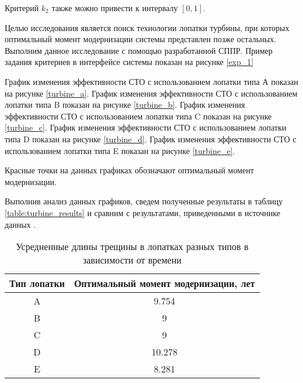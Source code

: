 Критерий $k_2$ также можно привести к интервалу $[0,1]$.

Целью исследования является поиск технологии лопатки турбины, при которых оптимальный момент модернизации системы представлен позже остальных.
Выполним данное исследование с помощью разработанной СППР.
Пример задания критериев в интерфейсе системы показан на рисунке \ref{exp_1}


График изменения эффективности СТО с использованием лопатки типа А показан на рисунке \ref{turbine_a}.
График изменения эффективности СТО с использованием лопатки типа B показан на рисунке \ref{turbine_b}.
График изменения эффективности СТО с использованием лопатки типа C показан на рисунке \ref{turbine_c}.
График изменения эффективности СТО с использованием лопатки типа D показан на рисунке \ref{turbine_d}.
График изменения эффективности СТО с использованием лопатки типа E показан на рисунке \ref{turbine_e}.


Красные точки на данных графиках обозначают оптимальный момент модернизации.

Выполнив анализ данных графиков, сведем полученные результаты в таблицу \ref{table:turbine_results} и сравним с результатами, приведенными в источнике данных \cite{Degradation}.

\begin{table}[H]
    \centering
    \caption{Усредненные длины трещины в лопатках разных типов в зависимости от времени}\label{table:turbine}
    \begin{tabular}{|c|c|}
    \hline Тип лопатки & Оптимальный момент модернизации, лет \\
    \hline A & 9.754 \\
    \hline B & 9 \\
    \hline C & 9 \\
    \hline D & 10.278 \\
    \hline E & 8.281 \\
    \hline
    \end{tabular}
\end{table}

